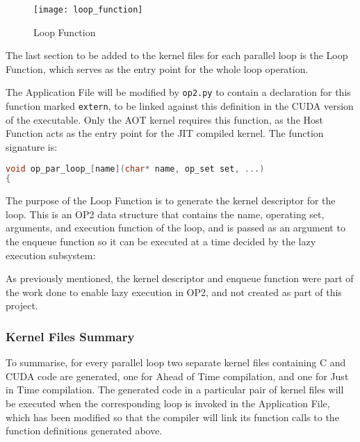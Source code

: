 \clearpage

\begin{wrapfigure}{r}{.33\textwidth}
  \centering
  \caption{Loop Function}
  \label{fig:loop_func}
  \texttt{[image: loop\_function]}
\end{wrapfigure}
The last section to be added to the kernel files for each parallel loop is the Loop Function, which serves as the entry point for the whole loop operation.
 \par
The Application File will be modified by \verb|op2.py| to contain a declaration for this function marked \verb|extern|, to be linked against this definition in the CUDA version of the executable. Only the AOT kernel requires this function, as the Host Function acts as the entry point for the JIT compiled kernel. The function signature is:
\begin{lstlisting}[backgroundcolor=\color{blue!20}, language=C]
void op_par_loop_[name](char* name, op_set set, ...)
{

\end{lstlisting}
\par
\noindent The purpose of the Loop Function is to generate the kernel descriptor for the loop. This is an OP2 data structure that contains the name, operating set, arguments, and execution function of the loop, and is passed as an argument to the enqueue function so it can be executed at a time decided by the lazy execution subsystem:

\noindent As previously mentioned, the kernel descriptor and enqueue function were part of the work done to enable lazy execution in OP2, and not created as part of this project.

\clearpage

\subsubsection{Kernel Files Summary}
\label{impl_summary}

To summarise, for every parallel loop two separate kernel files containing C and CUDA code are generated, one for Ahead of Time compilation, and one for Just in Time compilation. The generated code in a particular pair of kernel files will be executed when the corresponding loop is invoked in the Application File, which has been modified so that the compiler will link its function calls to the function definitions generated above.


